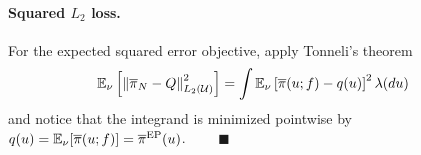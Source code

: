 \documentclass[12pt]{article}
\begin{document}
\paragraph{Squared $L_2$ loss.} 
For the expected squared error objective, apply Tonneli's theorem 
\begin{align}
\E_{\emDist[]}\left[\norm{\postNormEm - \qMeas}^2_{L_2(\parSpace)} \right]
&= \int \E_{\emDist[]} \left[\postDensNorm(\Par; \targetTraj) - \qDens(\Par) \right]^2 \refMeas(d\Par) \nonumber
\end{align}
and notice that the integrand is minimized pointwise by
$\qDens(\Par) = \E_{\emDist[]}[\postDensNorm(\Par; \targetTraj)] = \postApproxEP[](\Par)$. $\qquad \blacksquare$
 
 
% 
\end{document}
